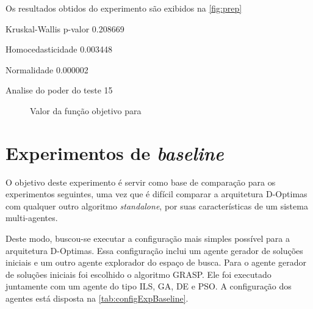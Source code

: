 Os resultados obtidos do experimento são exibidos na \autoref{fig:prep}

Kruskal-Wallis p-valor 0.208669

Homocedasticidade 0.003448

Normalidade 0.000002

Analise do poder do teste 15


\begin{figure}
    \centering
    
    \caption{Valor da função objetivo para}
    \label{fig:my_label}
\end{figure}


\section{Experimentos de \textit{baseline}}
\label{sec:baseline}
O objetivo deste experimento é servir como base de comparação para os experimentos seguintes, uma vez que é difícil comparar a arquitetura D-Optimas com qualquer outro algoritmo \textit{standalone}, por suas características de um sistema multi-agentes.

Deste modo, buscou-se executar a configuração mais simples possível para a arquitetura D-Optimas. Essa configuração inclui um agente gerador de soluções iniciais e um outro agente explorador do espaço de busca. Para o agente gerador de soluções iniciais foi escolhido o algoritmo GRASP. Ele foi executado juntamente com um agente do tipo ILS, GA, DE e PSO. 
A configuração dos agentes está disposta na \autoref{tab:configExpBaseline}.

